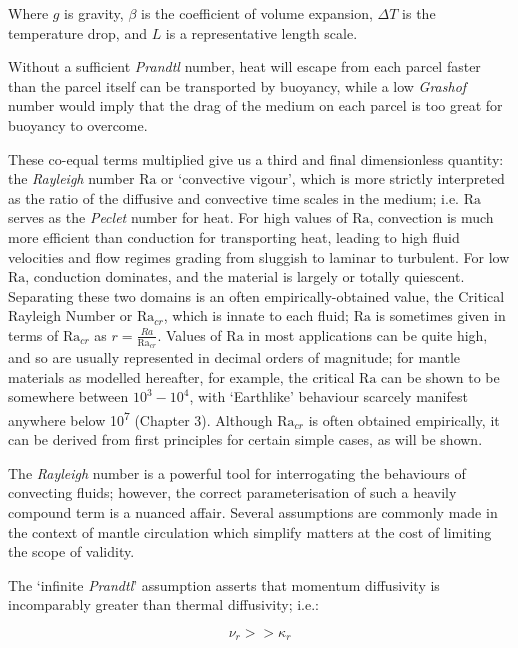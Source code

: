 \documentclass[a4paper,11pt,oneside]{book}
\begin{document}
Where $g$ is gravity, $\beta$ is the coefficient of volume expansion, $\Delta T$ is the temperature drop, and $L$ is a representative length scale.

Without a sufficient \textit{Prandtl} number, heat will escape from each parcel faster than the parcel itself can be transported by buoyancy, while a low \textit{Grashof} number would imply that the drag of the medium on each parcel is too great for buoyancy to overcome.

These co-equal terms multiplied give us a third and final dimensionless quantity: the \textit{Rayleigh} number $\mathrm{Ra}$ or `convective vigour', which is more strictly interpreted as the ratio of the diffusive and convective time scales in the medium; i.e. $\mathrm{Ra}$ serves as the \textit{Peclet} number for heat. For high values of $\mathrm{Ra}$, convection is much more efficient than conduction for transporting heat, leading to high fluid velocities and flow regimes grading from sluggish to laminar to turbulent. For low $\mathrm{Ra}$, conduction dominates, and the material is largely or totally quiescent. Separating these two domains is an often empirically-obtained value, the Critical Rayleigh Number or $\mathrm{Ra}_{cr}$, which is innate to each fluid; $\mathrm{Ra}$ is sometimes given in terms of $\mathrm{Ra}_{cr}$ as $r = \frac{Ra}{\mathrm{Ra}_{cr}}$. Values of $\mathrm{Ra}$ in most applications can be quite high, and so are usually represented in decimal orders of magnitude; for mantle materials as modelled hereafter, for example, the critical $\mathrm{Ra}$ can be shown to be somewhere between $10^3 -10^4$, with `Earthlike' behaviour scarcely manifest anywhere below 10\textsuperscript{7} (Chapter 3). Although $\mathrm{Ra}_{cr}$ is often obtained empirically, it can be derived from first principles for certain simple cases, as will be shown.

The \textit{Rayleigh} number is a powerful tool for interrogating the behaviours of convecting fluids; however, the correct parameterisation of such a heavily compound term is a nuanced affair. Several assumptions are commonly made in the context of mantle circulation which simplify matters at the cost of limiting the scope of validity.

The `infinite \textit{Prandtl}' assumption asserts that momentum diffusivity is incomparably greater than thermal diffusivity; i.e.:

\begin{equation}
\nu_r >> \kappa_r
\end{equation}
\end{document}
